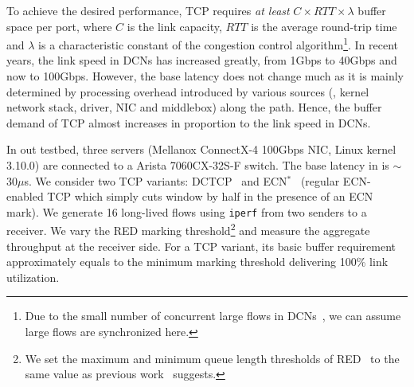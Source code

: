 To achieve the desired performance, TCP requires \emph{at least} $C\times RTT \times \lambda$ buffer space per port, where $C$ is the link capacity, $RTT$ is the average round-trip time and $\lambda$ is a characteristic constant of the congestion control algorithm\footnote{Due to the small number of concurrent large flows in DCNs~\cite{dctcp}, we can assume large flows are synchronized here.}. In recent years, the link speed in DCNs has increased greatly, from 1Gbps to 40Gbps and now to 100Gbps. However, the base latency does not change much as it is mainly determined by processing overhead introduced by various sources (\eg, kernel network stack, driver, NIC and middlebox) along the path. Hence, the buffer demand of TCP almost increases in proportion to the link speed in DCNs.

\vspace{-1mm}
In out testbed, three servers (Mellanox ConnectX-4 100Gbps NIC, Linux kernel 3.10.0) are connected to a Arista 7060CX-32S-F switch. The base latency in is $\sim$30$\mu$s. We consider two TCP variants: DCTCP~\cite{dctcp} and ECN$^{*}$~\cite{tuning} (regular ECN-enabled TCP which simply cuts window by half in the presence of an ECN mark). We generate 16 long-lived flows using \texttt{iperf} from two senders to a receiver. We vary the RED marking threshold\footnote{We set the maximum and minimum queue length thresholds of RED~\cite{RED} to the same value as previous work~\cite{dctcp,tuning} suggests.} and measure the aggregate throughput at the receiver side. For a TCP variant, its basic buffer requirement approximately equals to the minimum marking threshold delivering 100\% link utilization.

